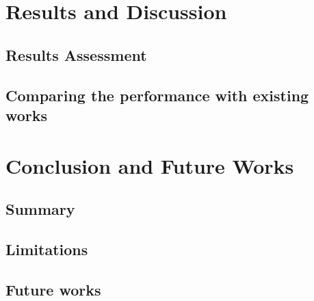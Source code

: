 \documentclass[letterpaper,12pt,titlepage,oneside,final]{book}
\begin{document}
\chapter{Results and Discussion}

\section{Results Assessment}

\section{Comparing the performance with existing works}

\chapter{Conclusion and Future Works}

\section{Summary}

\section{Limitations}

\section{Future works}


\appendix
\end{document}
